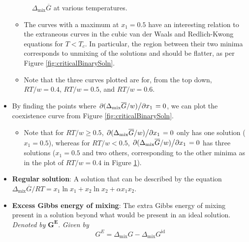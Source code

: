 \documentclass[../notes.tex]{subfiles}
\begin{document}
\begin{itemize}
\begin{figure}[h!]
        \caption{$\Delta_\text{mix}\overline{G}$ at various temperatures.}
        \label{fig:mixingTemperature}
    \end{figure}
    \begin{itemize}
        \item The curves with a maximum at $x_1=0.5$ have an interesting relation to the extraneous curves in the cubic van der Waals and Redlich-Kwong equations for $T<T_c$. In particular, the region between their two minima corresponds to unmixing of the solutions and should be flatter, as per Figure \ref{fig:criticalBinarySoln}.
        \item Note that the three curves plotted are for, from the top down, $RT/w=0.4$, $RT/w=0.5$, and $RT/w=0.6$.
    \end{itemize}
    \item By finding the points where $\pdv*{(\Delta_\text{mix}\overline{G}/w)}{x_1}=0$, we can plot the coexistence curve from Figure \ref{fig:criticalBinarySoln}.
    \begin{itemize}
        \item Note that for $RT/w\geq 0.5$, $\pdv*{(\Delta_\text{mix}\overline{G}/w)}{x_1}=0$ only has one solution ($x_1=0.5$), whereas for $RT/w<0.5$, $\pdv*{(\Delta_\text{mix}\overline{G}/w)}{x_1}=0$ has three solutions ($x_1=0.5$ and two others, corresponding to the other minima as in the plot of $RT/w=0.4$ in Figure \ref{fig:mixingTemperature}).
    \end{itemize}
    \item \textbf{Regular solution}: A solution that can be described by the equation $\Delta_\text{mix}\overline{G}/RT=x_1\ln x_1+x_2\ln x_2+\alpha x_1x_2$.
    \item \textbf{Excess Gibbs energy of mixing}: The extra Gibbs energy of mixing present in a solution beyond what would be present in an ideal solution. \emph{Denoted by} $\bm{G^E}$. \emph{Given by}
    \begin{equation*}
        G^E = \Delta_\text{mix}G-\Delta_\text{mix}G^\text{id}

\end{equation*}
\end{itemize}
\end{document}
